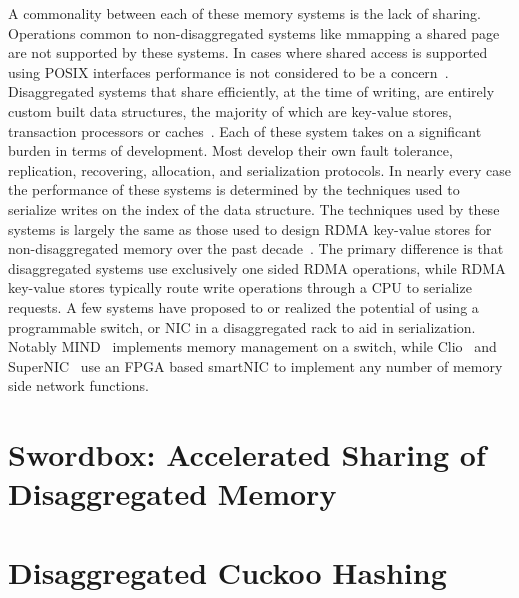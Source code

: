 \documentclass[12pt]{ucsddissertation}
\begin{document}
A commonality between each of these memory systems is the lack of sharing. Operations common to
non-disaggregated systems like mmapping a shared page are not supported by these systems. In cases
where shared access is supported using POSIX interfaces performance is not considered to be a
concern~\cite{Regions}. Disaggregated systems that share efficiently, at the time of writing, are
entirely custom built data structures, the majority of which are key-value stores, transaction
processors or caches~\cite{clover, sherman, race, fusee, rolex, ford, ditto}. Each of these system
takes on a significant burden in terms of development. Most develop their own fault tolerance,
replication, recovering, allocation, and serialization protocols. In nearly every case the
performance of these systems is determined by the techniques used to serialize writes on the index
of the data structure.
The techniques used by these systems is largely the same as those used to design RDMA key-value
stores for non-disaggregated memory over the past decade~\cite{pilaf,cell,herd,farm}. The primary
difference is that disaggregated systems use exclusively one sided RDMA operations, while RDMA
key-value stores typically route write operations through a CPU to serialize requests.
A few systems have proposed to or realized the potential of using a programmable switch, or NIC in a
disaggregated rack to aid in serialization. Notably MIND~\cite{mind} implements memory management on
a switch, while Clio~\cite{clio} and SuperNIC~\cite{supernic} use an FPGA based smartNIC to
implement any number of memory side network functions.





\chapter{Swordbox: Accelerated Sharing of Disaggregated Memory}
\label{chap:swordbox}










\chapter{Disaggregated Cuckoo Hashing}



%


%

\end{document}
